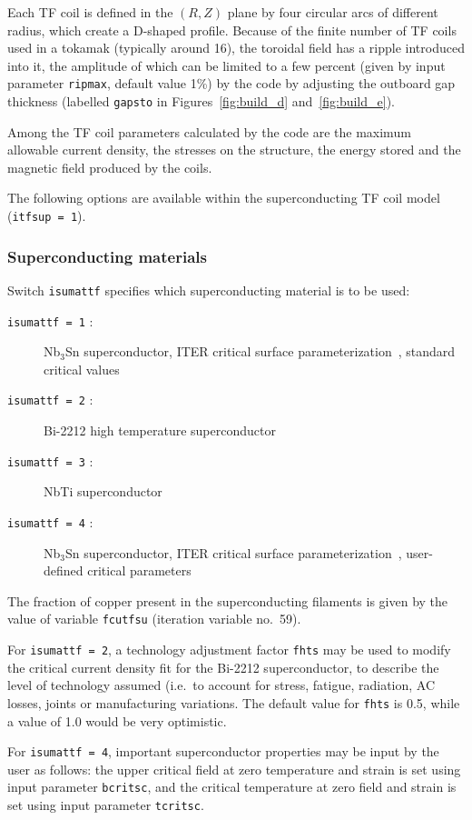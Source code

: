 \documentclass[11pt,a4paper]{report}
\begin{document}
Each TF coil is defined in the $(R,Z)$ plane by four circular arcs of
different radius, which create a D-shaped profile. Because of the finite
number of TF coils used in a tokamak (typically around 16), the toroidal field
has a ripple introduced into it, the amplitude of which can be limited to a
few percent (given by input parameter \texttt{ripmax}, default value 1\%) by
the code by adjusting the outboard gap thickness (labelled \texttt{gapsto} in
Figures~\ref{fig:build_d} and~\ref{fig:build_e}).

Among the TF coil parameters calculated by the code are the maximum allowable
current density, the stresses on the structure, the energy stored and the
magnetic field produced by the coils.

The following options are available within the superconducting TF coil model
(\texttt{itfsup = 1}).

\subsubsection{Superconducting materials}

Switch \texttt{isumattf} specifies which superconducting material is to be
used:
\begin{description}
\item [\texttt{isumattf = 1} :] Nb$_3$Sn superconductor, ITER critical surface
  parameterization~\cite{iter_nb3sn}, standard critical values
\item [\texttt{isumattf = 2} :] Bi-2212 high temperature superconductor %
\item [\texttt{isumattf = 3} :] NbTi superconductor
\item [\texttt{isumattf = 4} :] Nb$_3$Sn superconductor, ITER critical surface
  parameterization~\cite{iter_nb3sn}, user-defined critical parameters
\end{description}
The fraction of copper present in the superconducting filaments is given by
the value of variable \texttt{fcutfsu} (iteration variable no.\ 59).

For \texttt{isumattf = 2}, a technology adjustment factor \texttt{fhts} may be
used to modify the critical current density fit for the Bi-2212
superconductor, to describe the level of technology assumed (i.e.\ to account
for stress, fatigue, radiation, AC losses, joints or manufacturing variations.
The default value for \texttt{fhts} is 0.5, while a value of 1.0 would be very
optimistic.

For \texttt{isumattf = 4}, important superconductor properties may be input by
the user as follows: the upper critical field at zero temperature and strain
is set using input parameter \texttt{bcritsc}, and the critical temperature at
zero field and strain is set using input parameter \texttt{tcritsc}.
\end{document}
